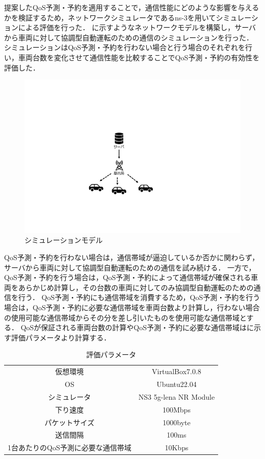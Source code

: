 \documentclass[a4paper,11pt,uplatex]{ujreport}
\begin{document}
  提案したQoS予測・予約を適用することで，通信性能にどのような影響を与えるかを検証するため，ネットワークシミュレータであるns-3\cite{ns-3}を用いてシミュレーションによる評価を行った．
  に示すようなネットワークモデルを構築し，サーバから車両に対して協調型自動運転のための通信のシミュレーションを行った．
  シミュレーションはQoS予測・予約を行わない場合と行う場合のそれぞれを行い，車両台数を変化させて通信性能を比較することでQoS予測・予約の有効性を評価した．\par

  \begin{figure}[tb]
    \centering
    \includegraphics[width=0.41\linewidth]{img/シミュレーションモデル2.pdf}
    \caption{シミュレーションモデル}
    \label{fig:model}
  \end{figure}

  QoS予測・予約を行わない場合は，通信帯域が逼迫しているか否かに関わらず，サーバから車両に対して協調型自動運転のための通信を試み続ける．
  一方で，QoS予測・予約を行う場合は，QoS予測・予約によって通信帯域が確保される車両をあらかじめ計算し，その台数の車両に対してのみ協調型自動運転のための通信を行う．
  QoS予測・予約にも通信帯域を消費するため，QoS予測・予約を行う場合は，QoS予測・予約に必要な通信帯域を車両台数より計算し，行わない場合の使用可能な通信帯域からその分を差し引いたものを使用可能な通信帯域とする．
  QoSが保証される車両台数の計算やQoS予測・予約に必要な通信帯域はに示す評価パラメータより計算する．\par
  
  \begin{table}[tb]
    \centering
    \caption{評価パラメータ}
    \label{tab:parameter}
    \begin{tabular}{cc}
      \hline
      仮想環境 & VirtualBox7.0.8\\
      OS & Ubuntu22.04\\
      シミュレータ & NS3 5g-lena NR Module\\
      下り速度 & 100Mbps\\
      パケットサイズ & 1000byte\\
      送信間隔 & 100ms\\
      1台あたりのQoS予測に必要な通信帯域 & 10Kbps\\
      \hline
    \end{tabular}
  \end{table}
\end{document}
